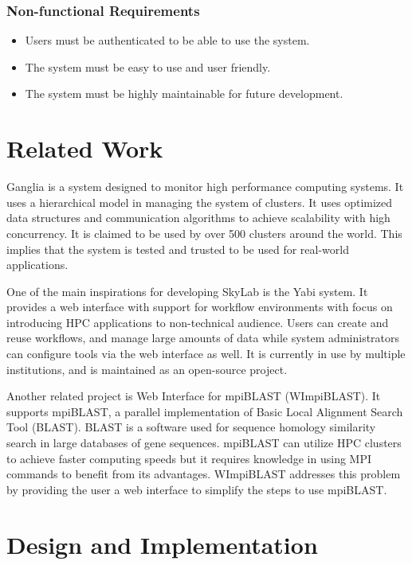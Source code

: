 \subsubsection*{Non-functional Requirements}
    \begin{itemize}
    	\item Users must be authenticated to be able to use the system.
       	\item The system must be easy to use and user friendly.
       	\item The system must be highly maintainable for future development.  
	\end{itemize}
        
\section {Related Work}


Ganglia is a system designed to monitor high performance computing systems. It uses a hierarchical model in managing the system of clusters. It uses optimized data structures and communication algorithms to achieve scalability with high concurrency. It is claimed to be used by over 500 clusters around the world. This implies that the system is tested and trusted to be used for real-world applications\cite{1395654820040701}.
	    
One of the main inspirations for developing SkyLab is the Yabi system. It provides a web interface with support for workflow environments with focus on introducing HPC applications to non-technical audience. Users can create and reuse workflows, and manage large amounts of data while system administrators can configure tools via the web interface as well. It is currently in use by multiple institutions, and is maintained as an open-source project\cite{7411021620120101}.	    	    
	    
Another related project is Web Interface for mpiBLAST (WImpiBLAST). It supports mpiBLAST, a parallel implementation of Basic Local Alignment Search Tool (BLAST). BLAST is a software used for sequence homology similarity search in large databases of gene sequences. mpiBLAST can utilize HPC clusters to achieve faster computing speeds but it requires knowledge in using MPI commands to benefit from its advantages. WImpiBLAST addresses this problem by providing the user a web interface to simplify the steps to use mpiBLAST\cite{9686120720140601}.   
            
        
\section{Design and Implementation}

